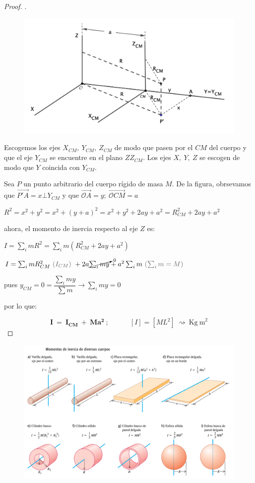 \begin{proof}.
\begin{figure}[H]
	\centering
	\includegraphics[width=.9\textwidth]{imagenes/imagenes16/T16IM05.png}
\end{figure}
Escogemos los ejes $X_{CM},\ Y_{CM},\ Z_{CM}$ de modo que pasen por el $CM$ del cuerpo y que el eje $Y_{CM}$ se encuentre en el plano $ZZ_{CM}$. Los ejes $X,\ Y,\ Z$ se escogen de modo que $Y$ coincida con $Y_{CM}$. 

Sea $P$ un punto arbitrario del cuerpo rígido de masa $M$. De la figura, obrsevamos que $\overrightarrow{P'A}=x\bot Y_{CM}$ y que $\overrightarrow{\mathcal OA}=y;\ \overrightarrow{\mathcal OCM}=a$

$R^2=x^2+y^2=x^2+(y+a)^2=x^2+y^2+2ay+a^2=R^2_{CM}+2ay+a^2$

ahora, el momento de inercia respecto al eje $Z$ es:

$I=\sum_i mR^2=\sum_i m(R^2_{CM} +2ay+a^2)$

$I=\sum_i mR^2_{CM} \ \textcolor{gris}{(I_{CM})}\ +2a\cancelto{0}{\sum_i my} + a^2\sum_i m \ \textcolor{gris}{ (\sum_i m=M) } \ $

pues $y_{CM}=0=\dfrac{\sum_i my}{\sum m} \to \sum_i my=0$

por lo que:

$$ \boldsymbol{ I \ = \ I_{CM} \ + \ M a^2 }\ ; \quad  \qquad [I]=[ML^2] \ \rightsquigarrow  \ \mathrm{Kg\ m}^2$$
\end{proof}



\begin{figure}[h]
	\centering
	\includegraphics[width=1\textwidth]{imagenes/imagenes16/T16IM06.png}
\end{figure}



